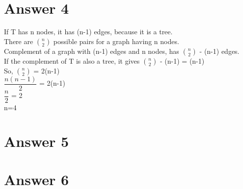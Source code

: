 \documentclass[12pt]{article}
\begin{document}
\section*{Answer 4}
 If T has n nodes, it has (n-1) edges, because it is a tree. \\
 There are $\binom{n}{2}$ possible pairs for a graph having n nodes. \\
 Complement of a graph with (n-1) edges and n nodes, has $\binom{n}{2}$ - (n-1) edges. \\
 If the complement of T is also a tree, it gives $\binom{n}{2}$ - (n-1) = (n-1) \\
 So, $\binom{n}{2}$ = 2(n-1) \\
 $\dfrac{n(n-1)}{2}$ = 2(n-1) \\
 $\dfrac{n}{2}$ = 2 \\
 n=4 \\

\section*{Answer 5}


\section*{Answer 6}
\end{document}
